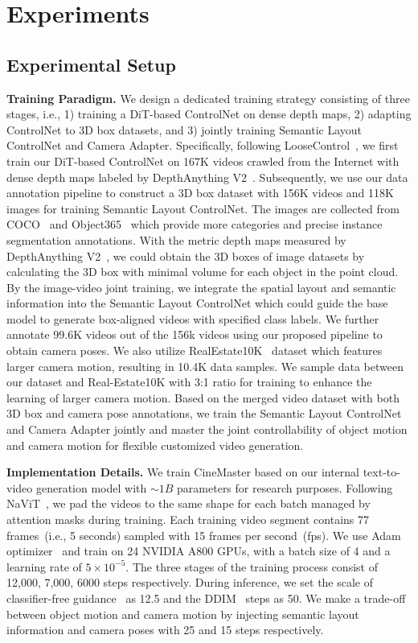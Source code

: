 
\section{Experiments}
\subsection{Experimental Setup}
\noindent\textbf{Training Paradigm.} We design a dedicated training strategy consisting of three stages, i.e., 1) training a DiT-based ControlNet on dense depth maps, 2) adapting ControlNet to 3D box datasets, and 3) jointly training Semantic Layout ControlNet and Camera Adapter. Specifically, following LooseControl~\cite{bhat2024loosecontrol}, we first train our DiT-based ControlNet on 167K videos crawled from the Internet with dense depth maps labeled by DepthAnything V2~\cite{depth_anything_v2}. Subsequently, we use our data annotation pipeline to construct a 3D box dataset with 156K videos and 118K images for training Semantic Layout ControlNet. The images are collected from COCO~\cite{lin2014microsoft} and Object365~\cite{shao2019objects365} which provide more categories and precise instance segmentation annotations. With the metric depth maps measured by DepthAnything V2~\cite{depth_anything_v2}, we could obtain the 3D boxes of image datasets by calculating the 3D box with minimal volume for each object in the point cloud. By the image-video joint training, we integrate the spatial layout and semantic information into the Semantic Layout ControlNet which could guide the base model to generate box-aligned videos with specified class labels. We further annotate 99.6K videos out of the 156k videos using our proposed pipeline to obtain camera poses. We also utilize RealEstate10K~\cite{realestate10k} dataset which features larger camera motion, resulting in 10.4K data samples. We sample data between our dataset and Real-Estate10K with 3:1 ratio for training to enhance the learning of larger camera motion. 
Based on the merged video dataset with both 3D box and camera pose annotations, we train the Semantic Layout ControlNet and Camera Adapter jointly and master the joint controllability of object motion and camera motion for flexible customized video generation.



\noindent\textbf{Implementation Details.} We train CineMaster based on our internal text-to-video generation model with $\sim1B$ parameters for research purposes. Following NaViT~\cite{dehghani2024patch}, we pad the videos to the same shape for each batch managed by attention masks during training. Each training video segment contains 77 frames~(i.e., 5 seconds) sampled with 15 frames per second~(fps). We use Adam optimizer~\cite{kingma2014adam} and train on 24 NVIDIA A800 GPUs, with a batch size of 4 and a learning rate of $5\times10^{-5}$. The three stages of the training process consist of 12,000, 7,000, 6000 steps respectively. During inference, we set the scale of classifier-free guidance~\cite{ho2022classifier} as 12.5 and the DDIM~\cite{song2020denoising} steps as 50. We make a trade-off between object motion and camera motion by injecting semantic layout information and camera poses with 25 and 15 steps respectively.


